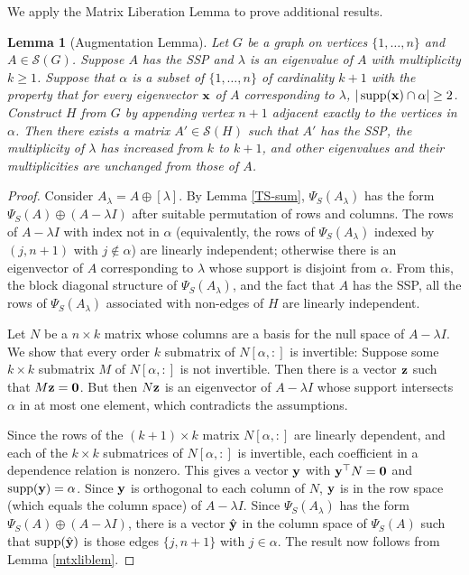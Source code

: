 \documentclass[11pt]{article}
\newtheorem{lem}[thm]{Lemma}
\theoremstyle{definition}
\theoremstyle{definition}
\theoremstyle{definition}
\DeclareMathOperator{\supp}{supp}
\newcommand{\verS}{\Psi_S}
\newcommand{\bx}{{\bf x}}
\newcommand{\bz}{{\bf z}}
\newcommand{\by}{{\bf y}}
\newcommand{\bzero}{{\bf 0}}
\newcommand{\x}{\times}
\newcommand{\lam}{\lambda}
\newcommand{\bpf}{\begin{proof}}
\newcommand{\epf}{\end{proof}\ms}
\newcommand{\ms}{\medskip}
\newcommand{\mptn}{\mathcal{S}} %
\def\trans{^{\top}}
\begin{document}
We apply the Matrix Liberation Lemma to prove additional results.

\begin{lem}[Augmentation Lemma]\label{shaun}  Let $G$ be a graph on vertices $\{1,\ldots,n\}$ and $A\in\mptn(G)$.  Suppose $A$ has the SSP and $\lam$ is an eigenvalue of $A$ with multiplicity {$k\ge 1$}. Suppose that $\alpha$ is a subset of $\{1,\ldots, n\}$ of cardinality $k+1$ with the property that for every eigenvector $\bx$ of $A$ corresponding to $\lam$, $|\supp(\bx)\cap \alpha |\ge 2$.  %
Construct $H$ from $G$ by appending vertex $n+1$ adjacent exactly to the vertices in $\alpha$. Then there exists a matrix $A'\in\mptn( H)$ such that $A'$ has the SSP,  the multiplicity of $\lam$ has increased from $k$ to $k+1$, and other eigenvalues and their  multiplicities are unchanged from those of $A$. \end{lem}

\bpf
Consider $A_{\lambda}= A\oplus [\lambda]$.  By Lemma \ref{TS-sum}, 
$\verS(A_\lambda) $ has the form 
$\verS(A) \oplus (A-\lambda I )$ after suitable permutation of rows and columns.
 The rows of $A-\lam I$ with index not in $\alpha$ (equivalently, the rows of $\verS(A_\lambda) $ indexed by $(j,n+1)$ with $j\not\in\alpha$)  are linearly independent; otherwise there is an eigenvector of $A$ corresponding to $\lambda$ whose support is disjoint from $\alpha$.  From this, the block diagonal structure of $\verS(A_\lambda)$, and the fact that $A$ has the SSP, all the rows of $\verS(A_\lambda) $ associated with non-edges of $H$ are linearly independent.

Let $N$ be a $n \times k$ matrix whose columns are a basis for the null space of $A-\lam I$. 
We show that every order $k$ submatrix of $N[\alpha,:]$ is  invertible: Suppose some  $k\x k$ submatrix $M$ of $N[\alpha,:]$ is  not invertible.  Then there is a vector $\bz$ such that $M\bz=\bzero$.  But then $N\bz$ is an eigenvector of 
$A-\lam I$ whose support intersects $\alpha$ in at most one element, which contradicts
the assumptions. 

Since the rows of the $(k+1)\times k$ matrix $N[\alpha,:]$ are linearly dependent, and each of the $k\times k$ submatrices of $N[\alpha,:]$ is invertible, each coefficient in a dependence relation is nonzero.  This gives a vector $\by$ with $\by\trans N=\bzero$ and $\supp(\by)=\alpha$.
Since $\by$ is orthogonal to each {column} of $N$, $\by$ is in the
row space (which equals the column space) of $A-\lam I$.  Since $\verS(A_\lambda) $ has the form $\verS(A) \oplus (A-\lambda I )$, there is a vector $\hat\by$ in the column space of $\verS(A)$ such that $\supp(\hat\by)$ is those edges $\{j,n+1\}$ with $j\in\alpha$.  The result now follows from Lemma \ref{mtxliblem}.
\epf
\end{document}
